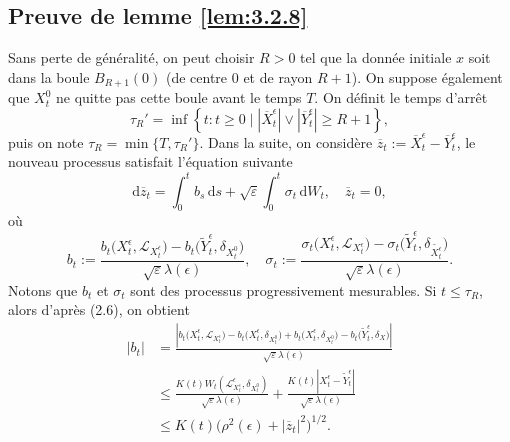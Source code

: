 \documentclass[12pt,a4paper,twoside]{report}%
\theoremstyle{definition}
\numberwithin{equation}{section}
\begin{document}
	\subsection*{Preuve de lemme \ref{lem:3.2.8}}
 Sans perte de généralité, on peut choisir \(R > 0\) tel que la donnée initiale \(x\) soit dans la boule \(B_{R+1}(0)\) (de centre \(0\) et de rayon \(R+1\)). On suppose également que \(X^0_t\) ne quitte pas cette boule avant le temps \(T\). On définit le temps d'arrêt 
 \[
 \tau_R' = \inf \left\{ t : t \geq 0 \mid |\overline{X}^\epsilon_t| \vee |\overline{Y}^\epsilon_t| \geq R+1 \right\},
 \]
 puis on note $\tau_R = \min\{ T, \tau_R' \}.$
Dans la suite, on considère \(\overline{z}_t := \overline{X}^\epsilon_t - \overline{Y}^\epsilon_t\), le nouveau processus satisfait l'équation suivante
\begin{equation}\label{eq:4.7}
	\mathrm{d} \overline{z}_t = \int_{0}^{t}b_s \, \mathrm{d}s + \sqrt{\varepsilon}\int_{0}^{t}  \sigma_t \, \mathrm{d} W_t, \quad \overline{z}_t = 0,
\end{equation}
où
\[
b_t := \frac{b_t\bigl(X^\epsilon_t, \mathscr{L}_{{X}_t^\epsilon }\bigr) - b_t\bigl(\tilde{Y}^\epsilon_t, \delta_{{X_t^0}}\bigr)}{\sqrt{\varepsilon} \lambda(\epsilon)}, \quad
\sigma_t := \frac{\sigma_t\bigl(X^\epsilon_t, \mathscr{L}_{{X}^\epsilon_t}\bigr) - \sigma_t\bigl(\tilde{Y}^\epsilon_t, \delta_{\tilde{X_t^\epsilon}}\bigr)}{\sqrt{\varepsilon} \lambda(\epsilon)}.
\]
Notons que \(b_t\) et \(\sigma_t\) sont des processus progressivement mesurables. Si \(t \leq \tau_R\), alors d'après (2.6), on obtient
\begin{align*}
	|b_t| &= \frac{\left| b_t\bigl(X^\epsilon_t, \mathscr{L}_{{X}^\epsilon_t}\bigr) - b_t\bigl(X^\epsilon_t, \delta_{{X}_t^0}\bigr) + b_t\bigl(X^\epsilon_t, \delta_{{X_t^0}}\bigr) - b_t\bigl(\tilde{Y}^\epsilon_t, \delta_{{X}}\bigr) \right|}{\sqrt{\varepsilon} \lambda(\epsilon)} \\
	&\leq \frac{K(t) W_t\left( \mathscr{L}^\epsilon_{{X}^\epsilon_t}, \delta_{{X_t^0}} \right)}{\sqrt{\varepsilon} \lambda(\epsilon)} + \frac{K(t) |X^\epsilon_t - \tilde{Y}^\epsilon_t|}{\sqrt{\varepsilon} \lambda(\epsilon)} \\
	&\leq K(t) \bigl( \rho^2(\epsilon) + |\overline{z}_t|^2 \bigr)^{1/2}.
\end{align*}
\end{document}
